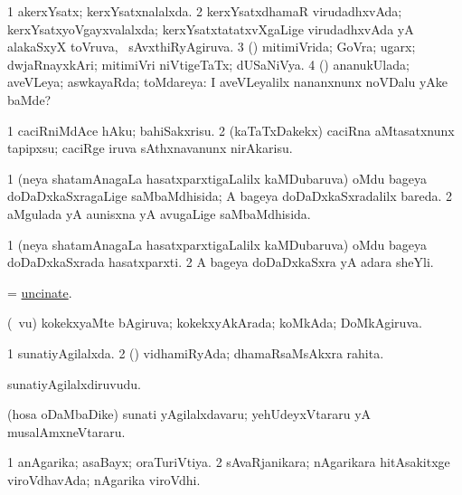 \bentry
{} 
\gl{\gu}
\expl{}
\bmng
\bnum
\num{1} akerxYsatx; kerxYsatxnalalxda. 
\num{2} kerxYsatxdhamaR virudadhxvAda; kerxYsatxyoVgayxvalalxda; kerxYsatxtatatxvXgaLige virudadhxvAda yA alakaSxyX toVruva, \kanmu\ sAvxthiRyAgiruva. 
\num{3} (\AmA) mitimiVrida; GoVra; ugarx; dwjaRnayxkAri; mitimiVri niVtigeTaTx; dUSaNiVya. 
\num{4} (\AmA) ananukUlada; aveVLeya; aswkayaRda; toMdareya:  I aveVLeyalilx nananxnunx noVDalu yAke baMde? 
\enum
\emng
\eentry

\bentry
{} 
\gl{\sakirx}
\expl{}
\bmng
\bnum
\num{1} caciRniMdAce hAku; bahiSakxrisu. 
\num{2} (kaTaTxDakekx) caciRna aMtasatxnunx tapipxsu; caciRge iruva sAthxnavanunx nirAkarisu. 
\enum
\emng
\eentry

\bentry
{} 
\gl{\gu}
\expl{}
\bmng
\bnum
\num{1} (neya shatamAnagaLa hasatxparxtigaLalilx kaMDubaruva) oMdu bageya doDaDxkaSxragaLige saMbaMdhisida; A bageya doDaDxkaSxradalilx bareda. 
\num{2} aMgulada yA aunisxna yA avugaLige saMbaMdhisida. 
\enum
\emng
\eentry

\bentry
{} 
\gl{\nA}
\expl{}
\bmng
\bnum
\num{1} (neya shatamAnagaLa hasatxparxtigaLalilx kaMDubaruva) oMdu bageya doDaDxkaSxrada hasatxparxti. 
\num{2} A bageya doDaDxkaSxra yA adara sheYli. 
\enum
\emng
\eentry

\bentry
{} 
\gl{\gu}
\expl{}
\bmng
= \hyperlink{uncinate}{uncinate}. 
\emng
\eentry

\bentry
{} 
\gl{\gu}
\expl{}
\bmng
(\aMrashA\ \mo vu) kokekxyaMte bAgiruva; kokekxyAkArada; koMkAda; DoMkAgiruva. 
\emng
\eentry

\bentry
{} 
\gl{\gu}
\bmng
\bnum
\num{1} sunatiyAgilalxda. 
\num{2} (\rUpa) vidhamiRyAda; dhamaRsaMsAkxra rahita. 
\enum
\emng
\eentry

\bentry
{}  
\gl{\nA} 
\bmng
sunatiyAgilalxdiruvudu. 
\emng

\noindent
\gl{\pagu}
\expl{}
\bmng
{} (hosa oDaMbaDike) sunati yAgilalxdavaru; yehUdeyxVtararu yA musalAmxneVtararu. 
\emng
\eentry

\bentry
{} 
\gl{\gu}
\expl{}
\bmng
\bnum
\num{1} anAgarika; asaBayx; oraTuriVtiya. 
\num{2} sAvaRjanikara; nAgarikara hitAsakitxge viroVdhavAda; nAgarika viroVdhi. 
\enum
\emng
\eentry

